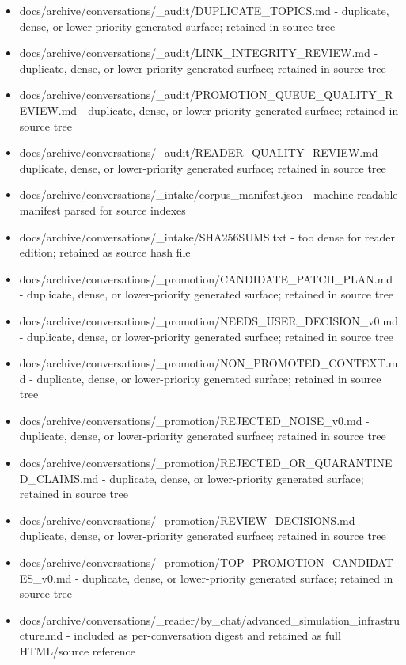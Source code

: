 \documentclass[11pt,a4paper]{report}
\begin{document}
\begin{itemize}
\item docs/archive/conversations/\_audit/DUPLICATE\_TOPICS.md - duplicate, dense, or lower-priority generated surface; retained in source tree
\item docs/archive/conversations/\_audit/LINK\_INTEGRITY\_REVIEW.md - duplicate, dense, or lower-priority generated surface; retained in source tree
\item docs/archive/conversations/\_audit/PROMOTION\_QUEUE\_QUALITY\_REVIEW.md - duplicate, dense, or lower-priority generated surface; retained in source tree
\item docs/archive/conversations/\_audit/READER\_QUALITY\_REVIEW.md - duplicate, dense, or lower-priority generated surface; retained in source tree
\item docs/archive/conversations/\_intake/corpus\_manifest.json - machine-readable manifest parsed for source indexes
\item docs/archive/conversations/\_intake/SHA256SUMS.txt - too dense for reader edition; retained as source hash file
\item docs/archive/conversations/\_promotion/CANDIDATE\_PATCH\_PLAN.md - duplicate, dense, or lower-priority generated surface; retained in source tree
\item docs/archive/conversations/\_promotion/NEEDS\_USER\_DECISION\_v0.md - duplicate, dense, or lower-priority generated surface; retained in source tree
\item docs/archive/conversations/\_promotion/NON\_PROMOTED\_CONTEXT.md - duplicate, dense, or lower-priority generated surface; retained in source tree
\item docs/archive/conversations/\_promotion/REJECTED\_NOISE\_v0.md - duplicate, dense, or lower-priority generated surface; retained in source tree
\item docs/archive/conversations/\_promotion/REJECTED\_OR\_QUARANTINED\_CLAIMS.md - duplicate, dense, or lower-priority generated surface; retained in source tree
\item docs/archive/conversations/\_promotion/REVIEW\_DECISIONS.md - duplicate, dense, or lower-priority generated surface; retained in source tree
\item docs/archive/conversations/\_promotion/TOP\_PROMOTION\_CANDIDATES\_v0.md - duplicate, dense, or lower-priority generated surface; retained in source tree
\item docs/archive/conversations/\_reader/by\_chat/advanced\_simulation\_infrastructure.md - included as per-conversation digest and retained as full HTML/source reference

\end{itemize}
\end{document}
